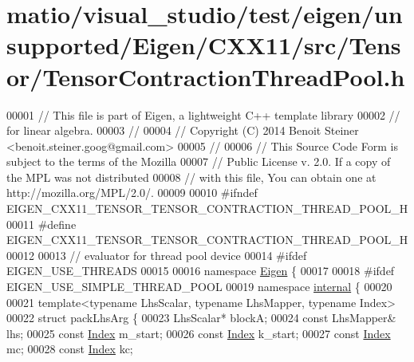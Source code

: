 \hypertarget{matio_2visual__studio_2test_2eigen_2unsupported_2_eigen_2_c_x_x11_2src_2_tensor_2_tensor_contraction_thread_pool_8h_source}{}\section{matio/visual\+\_\+studio/test/eigen/unsupported/\+Eigen/\+C\+X\+X11/src/\+Tensor/\+Tensor\+Contraction\+Thread\+Pool.h}
\label{matio_2visual__studio_2test_2eigen_2unsupported_2_eigen_2_c_x_x11_2src_2_tensor_2_tensor_contraction_thread_pool_8h_source}

\begin{DoxyCode}
00001 \textcolor{comment}{// This file is part of Eigen, a lightweight C++ template library}
00002 \textcolor{comment}{// for linear algebra.}
00003 \textcolor{comment}{//}
00004 \textcolor{comment}{// Copyright (C) 2014 Benoit Steiner <benoit.steiner.goog@gmail.com>}
00005 \textcolor{comment}{//}
00006 \textcolor{comment}{// This Source Code Form is subject to the terms of the Mozilla}
00007 \textcolor{comment}{// Public License v. 2.0. If a copy of the MPL was not distributed}
00008 \textcolor{comment}{// with this file, You can obtain one at http://mozilla.org/MPL/2.0/.}
00009 
00010 \textcolor{preprocessor}{#ifndef EIGEN\_CXX11\_TENSOR\_TENSOR\_CONTRACTION\_THREAD\_POOL\_H}
00011 \textcolor{preprocessor}{#define EIGEN\_CXX11\_TENSOR\_TENSOR\_CONTRACTION\_THREAD\_POOL\_H}
00012 
00013 \textcolor{comment}{// evaluator for thread pool device}
00014 \textcolor{preprocessor}{#ifdef EIGEN\_USE\_THREADS}
00015 
00016 \textcolor{keyword}{namespace }\hyperlink{namespace_eigen}{Eigen} \{
00017 
00018 \textcolor{preprocessor}{#ifdef EIGEN\_USE\_SIMPLE\_THREAD\_POOL}
00019 \textcolor{keyword}{namespace }\hyperlink{namespaceinternal}{internal} \{
00020 
00021 \textcolor{keyword}{template}<\textcolor{keyword}{typename} LhsScalar, \textcolor{keyword}{typename} LhsMapper, \textcolor{keyword}{typename} Index>
00022 \textcolor{keyword}{struct }packLhsArg \{
00023   LhsScalar* blockA;
00024   \textcolor{keyword}{const} LhsMapper& lhs;
00025   \textcolor{keyword}{const} \hyperlink{namespace_eigen_a62e77e0933482dafde8fe197d9a2cfde}{Index} m\_start;
00026   \textcolor{keyword}{const} \hyperlink{namespace_eigen_a62e77e0933482dafde8fe197d9a2cfde}{Index} k\_start;
00027   \textcolor{keyword}{const} \hyperlink{namespace_eigen_a62e77e0933482dafde8fe197d9a2cfde}{Index} mc;
00028   \textcolor{keyword}{const} \hyperlink{namespace_eigen_a62e77e0933482dafde8fe197d9a2cfde}{Index} kc;

\end{DoxyCode}
